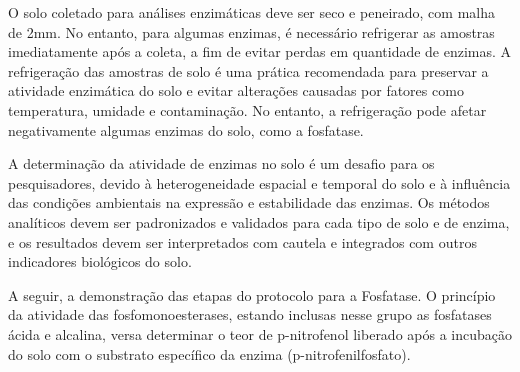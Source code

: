 O solo coletado para análises enzimáticas deve ser seco e peneirado, com malha de 2mm. No entanto, para algumas enzimas, é necessário refrigerar as amostras imediatamente após a coleta, a fim de evitar perdas em quantidade de enzimas. A refrigeração das amostras de solo é uma prática recomendada para preservar a atividade enzimática do solo e evitar alterações causadas por fatores como temperatura, umidade e contaminação. No entanto, a refrigeração pode afetar negativamente algumas enzimas do solo, como a fosfatase. 

A determinação da atividade de enzimas no solo é um desafio para os pesquisadores, devido à heterogeneidade espacial e temporal do solo e à influência das condições ambientais na expressão e estabilidade das enzimas. Os métodos analíticos devem ser padronizados e validados para cada tipo de solo e de enzima, e os resultados devem ser interpretados com cautela e integrados com outros indicadores biológicos do solo.

A seguir, a demonstração das etapas do protocolo para a Fosfatase. O princípio da atividade das fosfomonoesterases, estando inclusas nesse grupo as fosfatases ácida e alcalina, versa determinar o teor de p-nitrofenol liberado após a incubação do solo com o substrato específico da enzima (p-nitrofenilfosfato).

